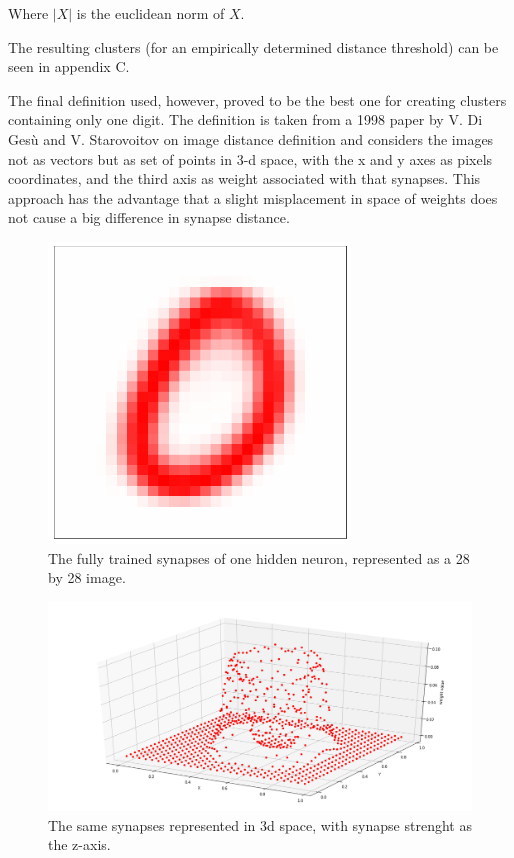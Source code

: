 \documentclass[a4paper]{report}
\begin{document}
Where $|X|$ is the euclidean norm of $X$.

The resulting clusters (for an empirically determined distance threshold) can be seen in appendix C.

The final definition used, however, proved to be the best one for creating clusters containing only one digit. The definition is taken from a 1998 paper by V. Di Gesù and V. Starovoitov on image distance definition and considers the images not as vectors but as set of points in 3-d space, with the x and y axes as pixels coordinates, and the third axis as weight associated with that synapses. This approach has the advantage that a slight misplacement in space of weights does not cause a big difference in synapse distance.

\begin{figure} [H]
    \centering
    \includegraphics [width=8cm ] {o/zero.png}
    \caption{The fully trained synapses of one hidden neuron, represented as a 28 by 28 image.}
    \label{zero}
\end{figure}

\begin{figure} [H]
    \centering
    \includegraphics [width=12cm ] {o/zero_three.png}
    \caption{The same synapses represented in 3d space, with synapse strenght as the z-axis.}
    \label{zero_three}
\end{figure}
\end{document}
